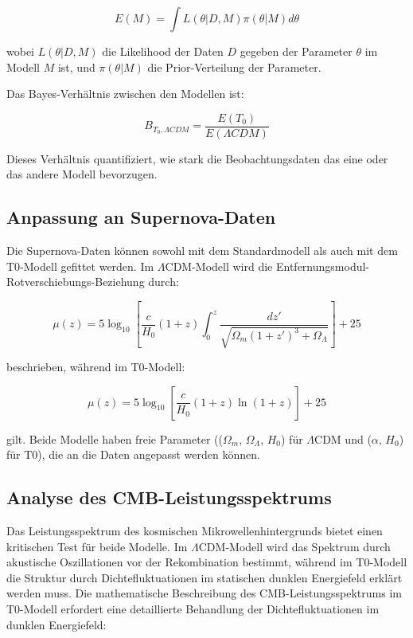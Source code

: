 \documentclass[a4paper,12pt]{article}
\theoremstyle{definition}
\theoremstyle{remark}
\begin{document}
	\begin{equation}
		E(M) = \int L(\theta|D,M) \pi(\theta|M) d\theta
	\end{equation}
	
	wobei $L(\theta|D,M)$ die Likelihood der Daten $D$ gegeben der Parameter $\theta$ im Modell $M$ ist, und $\pi(\theta|M)$ die Prior-Verteilung der Parameter.
	
	Das Bayes-Verhältnis zwischen den Modellen ist:
	
	\begin{equation}
		B_{T_0,\Lambda CDM} = \frac{E(T_0)}{E(\Lambda CDM)}
	\end{equation}
	
	Dieses Verhältnis quantifiziert, wie stark die Beobachtungsdaten das eine oder das andere Modell bevorzugen.
	
	\subsection{Anpassung an Supernova-Daten}
	Die Supernova-Daten können sowohl mit dem Standardmodell als auch mit dem T0-Modell gefittet werden. Im $\Lambda$CDM-Modell wird die Entfernungsmodul-Rotverschiebungs-Beziehung durch:
	
	\begin{equation}
		\mu(z) = 5 \log_{10}\left[\frac{c}{H_0}(1+z)\int_0^z \frac{dz'}{\sqrt{\Omega_m(1+z')^3 + \Omega_{\Lambda}}}\right] + 25
	\end{equation}
	
	beschrieben, während im T0-Modell:
	
	\begin{equation}
		\mu(z) = 5 \log_{10}\left[\frac{c}{H_0}(1+z)\ln(1+z)\right] + 25
	\end{equation}
	
	gilt. Beide Modelle haben freie Parameter (($\Omega_m$, $\Omega_{\Lambda}$, $H_0$) für $\Lambda$CDM und ($\alpha$, $H_0$) für T0), die an die Daten angepasst werden können.
	
	\subsection{Analyse des CMB-Leistungsspektrums}
	Das Leistungsspektrum des kosmischen Mikrowellenhintergrunds bietet einen kritischen Test für beide Modelle. Im $\Lambda$CDM-Modell wird das Spektrum durch akustische Oszillationen vor der Rekombination bestimmt, während im T0-Modell die Struktur durch Dichtefluktuationen im statischen dunklen Energiefeld erklärt werden muss. Die mathematische Beschreibung des CMB-Leistungsspektrums im T0-Modell erfordert eine detaillierte Behandlung der Dichtefluktuationen im dunklen Energiefeld:
	
\end{document}

